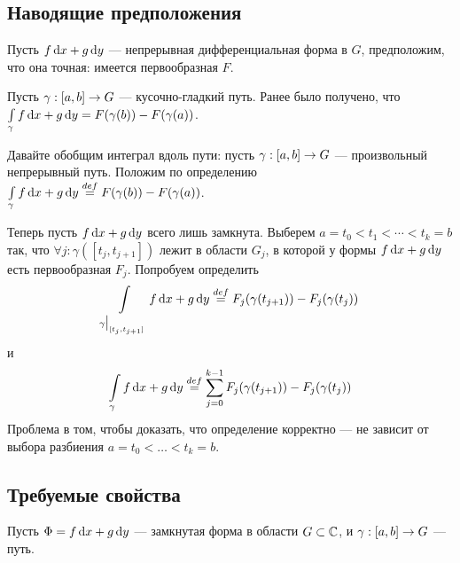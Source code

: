 \documentclass[a4paper]{report}
\begin{document}
    \subsection{Наводящие предположения}
    Пусть $f\operatorname{d}\! x + g\operatorname{d}\! y$ --- непрерывная дифференциальная форма в $G$, предположим, что она точная: имеется первообразная $F$.

    Пусть $\gamma: [a, b] \rightarrow G$ --- кусочно-гладкий путь.
    Ранее было получено, что $\int\limits_{\gamma}f \operatorname{d}\! x + g \operatorname{d}\! y = F(\gamma(b)) - F(\gamma(a))$.

    Давайте обобщим интеграл вдоль пути: пусть $\gamma: [a, b] \rightarrow G$ --- произвольный непрерывный путь.
    Положим по определению $\int\limits_{\gamma}f \operatorname{d}\! x + g \operatorname{d}\! y \overset{def}{=} F(\gamma(b)) - F(\gamma(a))$.

    Теперь пусть $f\operatorname{d}\! x + g\operatorname{d}\! y$ всего лишь замкнута.
    Выберем $a = t_0 < t_1 < \cdots < t_k = b$ так, что $\forall j: \gamma([t_j, t_{j+1}])$ лежит в области $G_j$, в которой у формы $f\operatorname{d}\! x + g\operatorname{d}\! y$ есть первообразная $F_j$.
    Попробуем определить
    \[\int\limits_{\gamma\big|_{[t_j, t_{j+1}]}}f \operatorname{d}\! x + g \operatorname{d}\! y \overset{def}{=} F_j(\gamma(t_{j + 1})) - F_j(\gamma(t_j))\]
    и
    \[\int\limits_{\gamma}f \operatorname{d}\! x + g \operatorname{d}\! y \overset{def}{=} \sum\limits_{j = 0}^{k - 1}F_j(\gamma(t_{j + 1})) - F_j(\gamma(t_j))\]
    Проблема в том, чтобы доказать, что определение корректно --- не зависит от выбора разбиения $a = t_0 < \dots < t_k = b$.
    \subsection{Требуемые свойства}
    Пусть $\Phi = f \operatorname{d}\! x + g \operatorname{d}\! y$ --- замкнутая форма в области $G \subset \mathbb{C}$, и $\gamma: [a, b] \rightarrow G$ --- путь.
\end{document}
